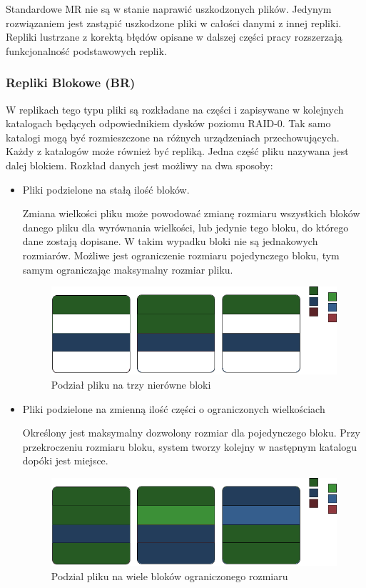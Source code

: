Standardowe MR nie są w stanie naprawić uszkodzonych plików. Jedynym rozwiązaniem jest zastąpić uszkodzone pliki w całości danymi z innej repliki. Repliki lustrzane z korektą błędów opisane w dalszej części pracy rozszerzają funkcjonalność podstawowych replik.
\subsubsection{Repliki Blokowe (BR)}
W replikach tego typu pliki są rozkładane na części i zapisywane w kolejnych katalogach będących odpowiednikiem dysków poziomu RAID-0. Tak samo katalogi mogą być rozmieszczone na różnych urządzeniach przechowujących. Każdy z katalogów może również być repliką. Jedna część pliku nazywana jest dalej blokiem.
Rozkład danych jest możliwy na dwa sposoby:
\begin{itemize}
    \item Pliki podzielone na stałą ilość bloków. 

            Zmiana wielkości pliku może powodować zmianę rozmiaru wszystkich bloków danego pliku dla wyrównania wielkości, lub jedynie tego bloku, do którego dane zostają dopisane. W takim wypadku bloki nie są jednakowych rozmiarów. Możliwe jest ograniczenie rozmiaru pojedynczego bloku, tym samym ograniczając maksymalny rozmiar pliku.
            \begin{figure}[h!]
                    \centering
                    \includegraphics{BR-1.png}
                    \caption{Podział pliku na trzy nierówne bloki }
                    \label{fig:br1}
            \end{figure}
    \item Pliki podzielone na zmienną ilość części o ograniczonych wielkościach

            Określony jest maksymalny dozwolony rozmiar dla pojedynczego bloku. Przy przekroczeniu rozmiaru bloku, system tworzy kolejny w następnym katalogu dopóki jest miejsce. 
            \begin{figure}[h!]
                    \centering
                    \includegraphics{BR-2.png}
                    \caption{Podzial pliku na wiele bloków ograniczonego rozmiaru}
                    \label{fig:br1}
            \end{figure}
 
\end{itemize}
